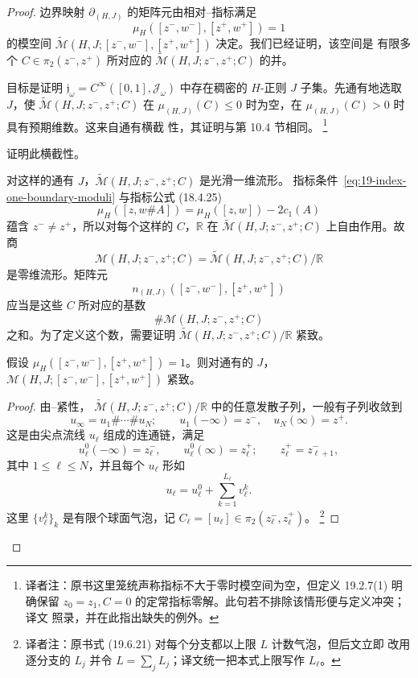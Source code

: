 \begin{proof}
边界映射 $\partial_{(H,J)}$ 的矩阵元由相对\personConley{}--\personZehnder{}指标满足
\begin{equation}
 \mu_H([z^-,w^-],[z^+,w^+])=1
\label{eq:19-index-one-boundary-moduli}
\end{equation}
的模空间
$\widetilde{\mathcal M}(H,J;[z^-,w^-],[z^+,w^+])$ 决定。我们已经证明，该空间是
有限多个 $C\in\pi_2(z^-,z^+)$ 所对应的
$\widetilde{\mathcal M}(H,J;z^-,z^+;C)$ 的并。

目标是证明
$\mathfrak j_\omega=C^\infty([0,1],\mathcal J_\omega)$ 中存在稠密的
$H$-正则 $J$ 子集。先通有地选取 $J$，使
$\widetilde{\mathcal M}(H,J;z^-,z^+;C)$ 在
$\mu_{(H,J)}(C)\leq0$ 时为空，在 $\mu_{(H,J)}(C)>0$ 时具有预期维数。这来自通有横截
性，其证明与第 10.4 节相同。
\footnote{译者注：原书这里笼统声称指标不大于零时模空间为空，但定义 19.2.7(1)
明确保留 $z_0=z_1,C=0$ 的定常指标零解。此句若不排除该情形便与定义冲突；译文
照录，并在此指出缺失的例外。}

\begin{exercise}
\label{ex:prove-hamiltonian-generic-transversality}
证明此横截性。
\end{exercise}

对这样的通有 $J$，$\widetilde{\mathcal M}(H,J;z^-,z^+;C)$ 是光滑一维流形。
指标条件~\eqref{eq:19-index-one-boundary-moduli} 与指标公式 (18.4.25)
\[
 \mu_H([z,w\#A])=\mu_H([z,w])-2c_1(A)
\]
蕴含 $z^-\neq z^+$，所以对每个这样的 $C$，$\mathbb R$ 在
$\widetilde{\mathcal M}(H,J;z^-,z^+;C)$ 上自由作用。故商
\[
 \mathcal M(H,J;z^-,z^+;C)
 =\widetilde{\mathcal M}(H,J;z^-,z^+;C)/\mathbb R
\]
是零维流形。矩阵元
\[
 n_{(H,J)}([z^-,w^-],[z^+,w^+])
\]
应当是这些 $C$ 所对应的基数
\[
 \#\mathcal M(H,J;z^-,z^+;C)
\]
之和。为了定义这个数，需要证明
$\widetilde{\mathcal M}(H,J;z^-,z^+;C)/\mathbb R$ 紧致。

\begin{proposition}
\label{prop:index-one-semipositive-compactness}
假设 $\mu_H([z^-,w^-],[z^+,w^+])=1$。则对通有的 $J$，
$\mathcal M(H,J;[z^-,w^-],[z^+,w^+])$ 紧致。
\end{proposition}

\begin{proof}
由\personGromov{}--\personFloer{}紧性，
$\widetilde{\mathcal M}(H,J;z^-,z^+;C)/\mathbb R$ 中的任意发散子列，一般有子列收敛到
\[
 u_\infty=u_1\#\cdots\#u_N;\qquad
 u_1(-\infty)=z^-,\quad u_N(\infty)=z^+.
\]
这是由尖点\personFloer{}流线 $u_\ell$ 组成的连通链，满足
\[
 u_\ell^0(-\infty)=z_\ell^-,\qquad
 u_\ell^0(\infty)=z_\ell^+;\qquad
 z_\ell^+=z_{\ell+1}^-,
\]
其中 $1\leq\ell\leq N$，并且每个 $u_\ell$ 形如
\begin{equation}
 u_\ell=u_\ell^0+\sum_{k=1}^{L_\ell}v_\ell^k.
\label{eq:19-cusp-floer-components}
\end{equation}
这里 $\{v_\ell^k\}_k$ 是有限个球面气泡，记
$C_\ell=[u_\ell]\in\pi_2(z_\ell^-,z_\ell^+)$。
\footnote{译者注：原书式 (19.6.21) 对每个分支都以上限 $L$ 计数气泡，但后文立即
改用逐分支的 $L_j$ 并令 $L=\sum_jL_j$；译文统一把本式上限写作 $L_\ell$。}


\end{proof}
\end{proof}
